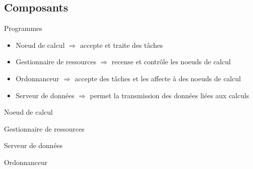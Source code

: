 \documentclass{beamer}
\begin{document}
\subsection{Composants}
\begin{frame}{Programmes}
    \begin{block}
        
    \begin{itemize}
        \item Noeud de calcul $\Longrightarrow$ accepte et traite des t\^aches
        \item Gestionnaire de ressources $\Longrightarrow$ recense et contrôle les noeuds de calcul
        \item Ordonnanceur $\Longrightarrow$ accepte des t\^aches et les affecte à des noeuds de calcul
        \item Serveur de données $\Longrightarrow$ permet la transmission des données liées aux calculs
    \end{itemize}
    \end{block}
\end{frame}

\begin{frame}{Noeud de calcul}
\end{frame}

\begin{frame}{Gestionnaire de ressources}
    
\end{frame}

\begin{frame}{Serveur de données}

    
\end{frame}

\begin{frame}{Ordonnanceur}
    
\end{frame}
\end{document}

